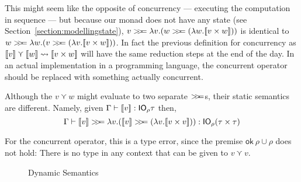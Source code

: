 This might seem like the opposite of concurrency --- executing the
computation in sequence --- but because our monad does not have any
state (see Section~\ref{section:modellingstate}),
${v \bind \lambda v . (w \bind (\lambda w . \lift{v \times w}))}$ is identical to
$w \bind \lambda w . (v \bind (\lambda v . \lift{v \times w}))$. In fact the previous
definition for concurrency as
$[\![ v]\!] \curlyvee [\![ w]\!] \leadsto [\![ v \times w]\!]$ will have the same reduction steps at
the end of the day. In an actual implementation in a programming
language, the concurrent operator should be replaced with something
actually concurrent.

Although the $v \curlyvee w$ might evaluate to two separate $>\!\!>\!\!=$s, their
static semantics are different. Namely, given
$\Gamma \vdash [\![ v]\!] : \mathsf{IO}_\rho \tau$ then,
\[
\Gamma \vdash \lift{v} \bind \lambda v . (\lift{v} \bind (\lambda v . \lift{v \times v})) : \IO_\rho (\tau \times \tau)
\]

For the concurrent operator, this is a type error, since the
premise $\textsf{ok} \ \rho \cup \rho$ does not hold: There is no type in any context
that can be given to $v \curlyvee v$.

\begin{figure}
  \caption{Dynamic Semantics}\label{fig:dynamicsemantics}
\end{figure}

